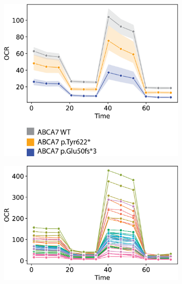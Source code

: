 \begin{figure}[ht]
    \begin{subfigure}[t]{0.33\textwidth}
        \caption{}
        \includegraphics[width=\textwidth]{./extended_plots/rep_seahorse_curves_by_line.png}        
    \end{subfigure}
    \begin{subfigure}[t]{0.33\textwidth}
        \caption{}
        \includegraphics[width=\textwidth]{./extended_plots/rep_seahorse_curves_all.png}        
    \end{subfigure}   
    \begin{subfigure}[t]{0.33\textwidth}
        \caption{}

\end{subfigure}
\end{figure}
